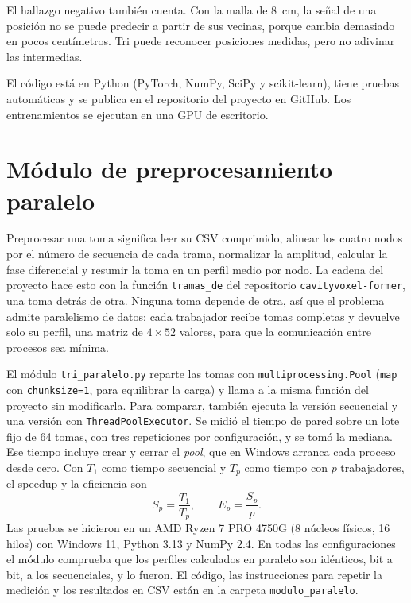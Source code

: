 \documentclass[10pt,journal]{IEEEtran}
\begin{document}
El hallazgo negativo también cuenta. Con la malla de 8~cm, la señal de una posición no se puede predecir a partir de sus vecinas, porque cambia demasiado en pocos centímetros. Tri puede reconocer posiciones medidas, pero no adivinar las intermedias.

El código está en Python (PyTorch, NumPy, SciPy y scikit-learn), tiene pruebas automáticas y se publica en el repositorio del proyecto en GitHub. Los entrenamientos se ejecutan en una GPU de escritorio.

\section{Módulo de preprocesamiento paralelo}\label{sec:paralelo}
Preprocesar una toma significa leer su CSV comprimido, alinear los cuatro nodos por el número de secuencia de cada trama, normalizar la amplitud, calcular la fase diferencial y resumir la toma en un perfil medio por nodo. La cadena del proyecto hace esto con la función \texttt{tramas\_de} del repositorio \texttt{cavityvoxel-former}, una toma detrás de otra. Ninguna toma depende de otra, así que el problema admite paralelismo de datos: cada trabajador recibe tomas completas y devuelve solo su perfil, una matriz de $4 \times 52$ valores, para que la comunicación entre procesos sea mínima.

El módulo \texttt{tri\_paralelo.py} reparte las tomas con \texttt{multiprocessing.Pool} (\texttt{map} con \texttt{chunksize=1}, para equilibrar la carga) y llama a la misma función del proyecto sin modificarla. Para comparar, también ejecuta la versión secuencial y una versión con \texttt{ThreadPoolExecutor}. Se midió el tiempo de pared sobre un lote fijo de 64 tomas, con tres repeticiones por configuración, y se tomó la mediana. Ese tiempo incluye crear y cerrar el \emph{pool}, que en Windows arranca cada proceso desde cero. Con $T_1$ como tiempo secuencial y $T_p$ como tiempo con $p$ trabajadores, el speedup y la eficiencia son
\begin{equation}
S_p = \frac{T_1}{T_p}, \qquad E_p = \frac{S_p}{p}.
\end{equation}
Las pruebas se hicieron en un AMD Ryzen 7 PRO 4750G (8 núcleos físicos, 16 hilos) con Windows 11, Python 3.13 y NumPy 2.4. En todas las configuraciones el módulo comprueba que los perfiles calculados en paralelo son idénticos, bit a bit, a los secuenciales, y lo fueron. El código, las instrucciones para repetir la medición y los resultados en CSV están en la carpeta \texttt{modulo\_paralelo}.
\end{document}

